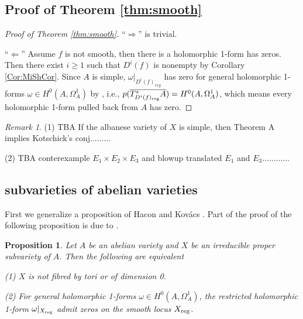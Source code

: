 \documentclass[a4paper,12pt,reqno]{amsart}
\theoremstyle{plain}
\newtheorem{proposition}[theorem]{Proposition}
\theoremstyle{remark}
\newtheorem{remark}[theorem]{Remark}
\begin{document}
\subsection{Proof of Theorem \ref{thm:smooth}}

\begin{proof}[Proof of Theorem \ref{thm:smooth}]
``$\Rightarrow$'' is trivial.

``$\Leftarrow$'' Assume $f$ is not smooth, then there is a holomorphic 1-form has zeros. Then there exist $i\geq 1$ such that $D^i(f)$ is nonempty by Corollary \ref{Cor:MiShCor}. Since $A$ is simple, $\omega|_{D^i(f)_{reg}}$ has zero for general holomorphic 1-forms $\omega\in H^0(A, \Omega_A^1)$ by \cite[Proposition 3.1]{HK05}, i.e.,  $p(\overline{T^*_{D^i(f)_{\textnormal{reg}}}A})=H^0(A, \Omega_A^1)$, which means every holomorphic 1-form pulled back from $A$ has zero.
\end{proof}


\begin{remark}
(1) {\color{red}TBA If the albanese variety of $X$ is simple, then Theorem A implies Kotschick's conj.........}

(2) {\color{red} TBA conterexample $E_1\times E_2\times E_3$ and blowup translated $E_1$ and $E_3$............}
\end{remark}

\subsection{subvarieties of abelian varieties}

First we generalize a proposition of Hacon and Kov\'acs \cite[Proposition 3.1]{HK05}. Part of the proof of the following proposition is due to \cite{HK05}.

\begin{proposition}\label{van-nonsimple}
Let $A$ be an abelian variety and $X$ be an irreducible proper subvariety of $A$. Then the following are equivalent

(1) $X$ is not fibred by tori or of dimension 0. 

(2) For general holomorphic 1-forms $\omega\in H^0(A, \Omega_A^1)$, the restricted holomorphic 1-form $\omega|_{X_{\textnormal{reg}}}$ admit zeros on the smooth locus $X_{\textnormal{reg}}$.
\end{proposition}
\end{document}
